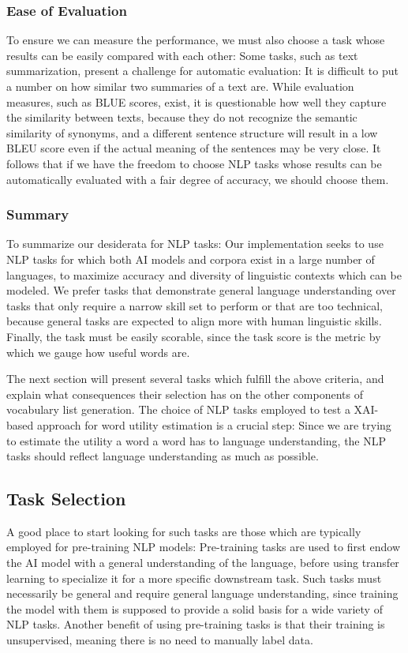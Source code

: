 \subsubsection{Ease of Evaluation}
To ensure we can measure the performance, we must also choose a task whose results can be easily compared with each other:
Some tasks, such as text summarization, present a challenge for automatic evaluation:
It is difficult to put a number on how similar two summaries of a text are.
While evaluation measures, such as BLUE scores, exist, it is questionable how well they capture the similarity between texts, because they do not recognize the semantic similarity of synonyms, and a different sentence structure will result in a low BLEU score even if the actual meaning of the sentences may be very close.
It follows that if we have the freedom to choose NLP tasks whose results can be automatically evaluated with a fair degree of accuracy, we should choose them.


\subsubsection{Summary}
To summarize our desiderata for NLP tasks:
Our implementation seeks to use NLP tasks for which both AI models and corpora exist in a large number of languages, to maximize accuracy and diversity of linguistic contexts which can be modeled.
We prefer tasks that demonstrate general language understanding over tasks that only require a narrow skill set to perform or that are too technical, because general tasks are expected to align more with human linguistic skills.
Finally, the task must be easily scorable, since the task score is the metric by which we gauge how useful words are.

The next section will present several tasks which fulfill the above criteria, and explain what consequences their selection has on the other components of vocabulary list generation.
The choice of NLP tasks employed to test a XAI-based approach for word utility estimation is a crucial step:
Since we are trying to estimate the utility a word a word has to language understanding, the NLP tasks should reflect language understanding as much as possible.

\subsection{Task Selection} \label{sec:nlp-tasks-selection}
A good place to start looking for such tasks are those which are typically employed for pre-training NLP models:
Pre-training tasks are used to first endow the AI model with a general understanding of the language, before using transfer learning to specialize it for a more specific downstream task.
Such tasks must necessarily be general and require general language understanding, since training the model with them is supposed to provide a solid basis for a wide variety of NLP tasks.
Another benefit of using pre-training tasks is that their training is unsupervised, meaning there is no need to manually label data.

